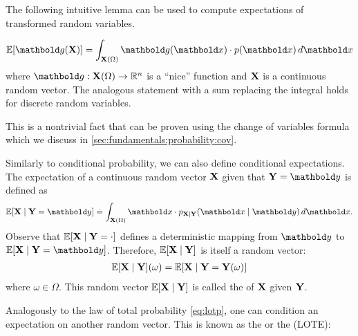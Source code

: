 The following intuitive lemma can be used to compute expectations of transformed random variables.

\begin{thmb}
  \begin{fct}
    \begin{align}
      \E{\vg(\rX)} = \int_{\rX(\Omega)} \vg(\vx) \cdot p(\vx) \,d\vx \label{eq:lotus}
    \end{align} where $\vg : \rX(\Omega) \to \R^n$ is a ``nice'' function and $\mathbf{X}$ is a continuous random vector.
    The analogous statement with a sum replacing the integral holds for discrete random variables.
  \end{fct}
\end{thmb}

This is a nontrivial fact that can be proven using the change of variables formula which we discuss in \cref{sec:fundamentals:probability:cov}.

Similarly to conditional probability, we can also define conditional expectations.
The expectation of a continuous random vector $\mathbf{X}$ given that $\rY = \vy$ is defined as \begin{align}
  \E{\rX \mid \rY = \vy} \defeq \int_{\rX(\Omega)} \vx \cdot p_{\rX \mid \rY}(\vx \mid \vy) \,d\vx.
\end{align}
Observe that $\E{\rX \mid \rY = {\cdot}}$ defines a deterministic mapping from $\vy$ to $\E{\rX \mid \rY = \vy}$.
Therefore, $\E{\rX \mid \rY}$ is itself a random vector: \begin{align}
  \E{\rX \mid \rY}(\omega) = \E{\rX \mid \rY = \rY(\omega)}
\end{align} where $\omega \in \Omega$.
This random vector $\E{\rX \mid \rY}$ is called the  of $\mathbf{X}$ given $\mathbf{Y}$.

Analogously to the law of total probability \eqref{eq:lotp}, one can condition an expectation on another random vector.
This is known as the  or the  (LOTE):

